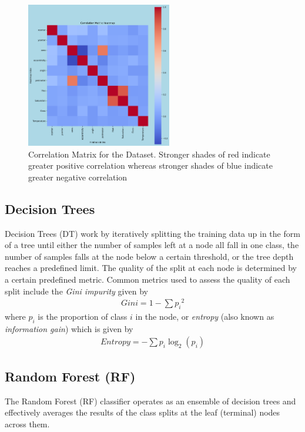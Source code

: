 \documentclass[journal,twocolumn,12pt,twoside]{IEEEtran}
\begin{document}
\begin{figure}
    \hspace{2em}\includegraphics*[width=2.5in,height=2.5in]{images/correlation_matrix_heatmap.png}
    \captionsetup{font=scriptsize}
    \caption{Correlation Matrix for the Dataset. Stronger shades of red indicate greater positive correlation whereas stronger shades of blue indicate greater negative correlation}
    \label{fig:corr}
\end{figure}

\subsection{Decision Trees}
Decision Trees (DT) work by iteratively splitting the training data up in the form of a tree until either the number of samples left at a node all fall in one class, the number of samples falls at the node below a certain threshold, or the tree depth reaches a predefined limit. The quality of the split at each node is determined by a certain predefined metric. Common metrics used to assess the quality of each split include the \textit{Gini impurity} given by
\begin{align*}
    Gini = 1-\sum{p_i}^2
\end{align*}
where $p_i$ is the proportion of class $i$ in the node, or \textit{entropy} (also known as \textit{information gain}) which is given by
\begin{align*}
    Entropy = -\sum{p_i\log_2(p_i)}
\end{align*}

\subsection{Random Forest (RF)}
The Random Forest (RF) classifier operates as an ensemble of decision trees and effectively averages the results of the class splits at the leaf (terminal) nodes across them.
\end{document}
